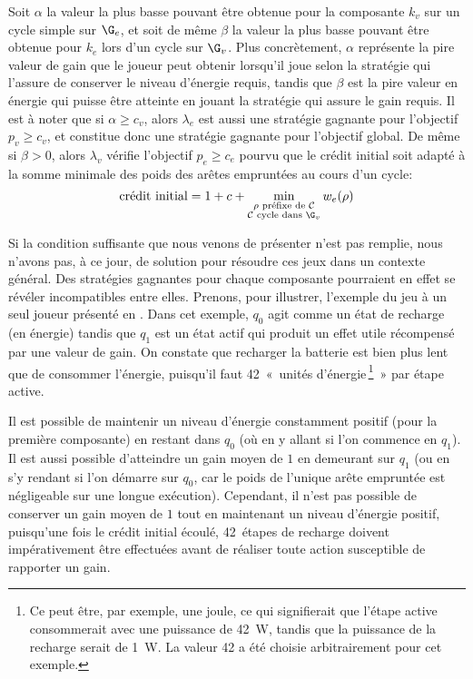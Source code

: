 Soit $\alpha$ la valeur la plus basse pouvant être obtenue pour la composante $k_v$ sur un cycle simple sur $\G_e$, et soit de même $\beta$ la valeur la plus basse pouvant être obtenue pour $k_e$ lors d'un cycle sur $\G_v$.
Plus concrètement, $\alpha$ représente la pire valeur de gain que le joueur peut obtenir lorsqu'il joue selon la stratégie qui l'assure de conserver le niveau d'énergie requis, tandis que $\beta$ est la pire valeur en énergie qui puisse être atteinte en jouant la stratégie qui assure le gain requis.
Il est à noter que si $\alpha \geq c_v$, alors $\lambda_e$ est aussi une stratégie gagnante pour l'objectif $p_v \geq c_v$, et constitue donc une stratégie gagnante pour l'objectif global.
De même si $\beta > 0$, alors $\lambda_v$ vérifie l'objectif $p_e \geq c_e$ pourvu que le crédit initial soit adapté à la somme minimale des poids des arêtes empruntées au cours d'un cycle:
\[\textrm{crédit initial} = 1+c+\min_{\substack{\rho \textrm{ préfixe de } \mathcal{C}\\
\mathcal{C}\textrm{ cycle dans } \G_v}} w_e(\rho)\]

\medskip

Si la condition suffisante que nous venons de présenter n'est pas remplie, nous n'avons pas, à ce jour, de solution pour résoudre ces jeux dans un contexte général.
Des stratégies gagnantes pour chaque composante pourraient en effet se révéler incompatibles entre elles.
Prenons, pour illustrer, l'exemple du jeu à un seul joueur présenté en .
Dans cet exemple, $q_0$ agit comme un état de recharge (en énergie) tandis que $q_1$ est un état actif qui produit un effet utile récompensé par une valeur de gain.
On constate que recharger la batterie est bien plus lent que de consommer l'énergie, puisqu'il faut 42 « unités d'énergie\,\footnote{Ce peut être, par exemple, une joule, ce qui signifierait que l'étape active consommerait avec une puissance de 42~W, tandis que la puissance de la recharge serait de 1~W. La valeur 42 a été choisie arbitrairement pour cet exemple.} » par étape active.

Il est possible de maintenir un niveau d'énergie constamment positif (pour la première composante) en restant dans $q_0$ (où en y allant si l'on commence en $q_1$).
Il est aussi possible d'atteindre un gain moyen de $1$ en demeurant sur $q_1$ (ou en s'y rendant si l'on démarre sur $q_0$, car le poids de l'unique arête empruntée est négligeable sur une longue exécution).
Cependant, il n'est pas possible de conserver un gain moyen de $1$ tout en maintenant un niveau d'énergie positif, puisqu'une fois le crédit initial écoulé, 42~étapes de recharge doivent impérativement être effectuées avant de réaliser toute action susceptible de rapporter un gain.

